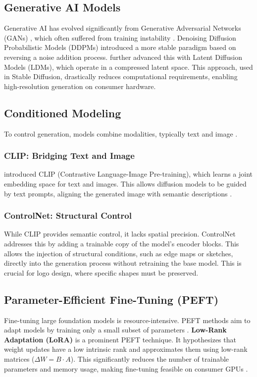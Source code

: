 \subsection{Generative AI Models}\label{subsec:generative_ac_ki-modelle}
Generative AI has evolved significantly from Generative Adversarial Networks (GANs) \cite{GOODFELLOW2014}, which often suffered from training instability \cite[2-3]{arjovsky2017wasserstein}. Denoising Diffusion Probabilistic Models (DDPMs) \cite[3]{HO2020} introduced a more stable paradigm based on reversing a noise addition process.
\citet{ROMBACH2022} further advanced this with Latent Diffusion Models (LDMs), which operate in a compressed latent space. This approach, used in Stable Diffusion, drastically reduces computational requirements, enabling high-resolution generation on consumer hardware.

\subsection{Conditioned Modeling}\label{subsec:konditionierte_modellierung}
To control generation, models combine modalities, typically text and image \cite{ZHANG2023}.

\subsubsection*{CLIP: Bridging Text and Image}\label{subsubsec:clip}
\citet{radford2021learning} introduced CLIP (Contrastive Language-Image Pre-training), which learns a joint embedding space for text and images. This allows diffusion models to be guided by text prompts, aligning the generated image with semantic descriptions \cite{RAMESH2022}.

\subsubsection*{ControlNet: Structural Control}\label{subsubsec:controlnet}
While CLIP provides semantic control, it lacks spatial precision. ControlNet \cite{ZHANG2023} addresses this by adding a trainable copy of the model's encoder blocks. This allows the injection of structural conditions, such as edge maps or sketches, directly into the generation process without retraining the base model. This is crucial for logo design, where specific shapes must be preserved.

\subsection{Parameter-Efficient Fine-Tuning (PEFT)}\label{subsec:finetuning}
Fine-tuning large foundation models is resource-intensive. PEFT methods aim to adapt models by training only a small subset of parameters \cite[2]{zhang2025parameter}.
\textbf{Low-Rank Adaptation (LoRA)} \cite[4]{HU2021} is a prominent PEFT technique. It hypothesizes that weight updates have a low intrinsic rank and approximates them using low-rank matrices ($ \Delta W = B \cdot A $). This significantly reduces the number of trainable parameters and memory usage, making fine-tuning feasible on consumer GPUs \cite[4]{Zhihao_2025}.

